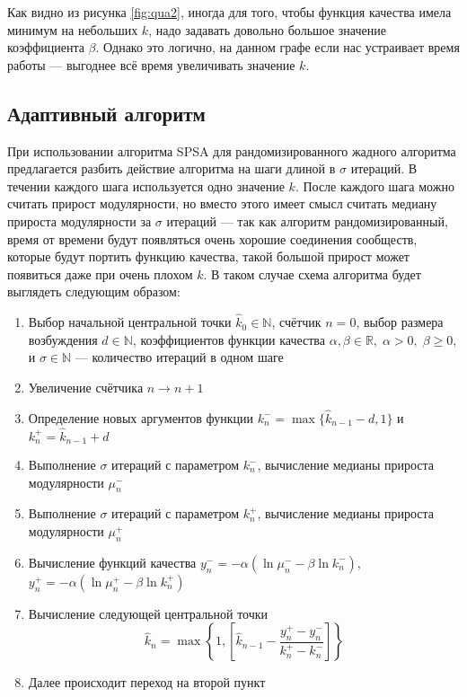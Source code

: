 Как видно из рисунка \ref{fig:qua2}, иногда для того, чтобы функция качества имела минимум на небольших $k$, надо задавать довольно большое значение коэффициента $\beta$. Однако это логично, на данном графе если нас устраивает время работы --- выгоднее всё время увеличивать значение $k$.



\subsection{Адаптивный алгоритм}

При использовании алгоритма SPSA для рандомизированного жадного алгоритма предлагается разбить действие алгоритма на шаги длиной в $\sigma$ итераций. В течении каждого шага используется одно значение $k$. После каждого шага можно считать прирост модулярности, но вместо этого имеет смысл считать медиану прироста модулярности за $\sigma$ итераций --- так как алгоритм рандомизированный, время от времени будут появляться очень хорошие соединения сообществ, которые будут портить функцию качества, такой большой прирост может появиться даже при очень плохом $k$. В таком случае схема алгоритма будет выглядеть следующим образом:

\begin{enumerate}
	\item Выбор начальной центральной точки $\hat{k}_0 \in \mathbb{N}$, счётчик $n = 0$, выбор размера возбуждения $d \in \mathbb{N}$, коэффициентов функции качества $\alpha, \beta \in \mathbb{R},\; \alpha > 0,\;\beta \ge 0$, и $\sigma \in \mathbb{N}$ --- количество итераций в одном шаге
	\item Увеличение счётчика $n \rightarrow n + 1$
	\item Определение новых аргументов функции $k_{n}^{-} = \max\{\hat{k}_{n - 1} - d, 1\}$ и $k_{n}^{+}=\hat{k}_{n - 1} + d$
	\item Выполнение $\sigma$ итераций с параметром $k_{n}^{-}$, вычисление медианы прироста модулярности $\mu_n^{-}$
	\item Выполнение $\sigma$ итераций с параметром $k_{n}^{+}$, вычисление медианы прироста модулярности $\mu_n^{+}$
	\item Вычисление функций качества $y_n^{-} = -\alpha (\ln \mu_n^{-} - \beta \ln k_n^{-})$, $y_n^{+} = -\alpha (\ln \mu_n^{+} - \beta \ln k_n^{+})$
	\item Вычисление следующей центральной точки
	\begin{equation}
		\hat{k}_n = \max\left\{1, \left[\hat{k}_{n - 1} - \frac{y_n^{+} - y_n^{-}}{k_n^{+} - k_n^{-}}\right]\right\}
	\end{equation}
	\item Далее происходит переход на второй пункт
\end{enumerate}

